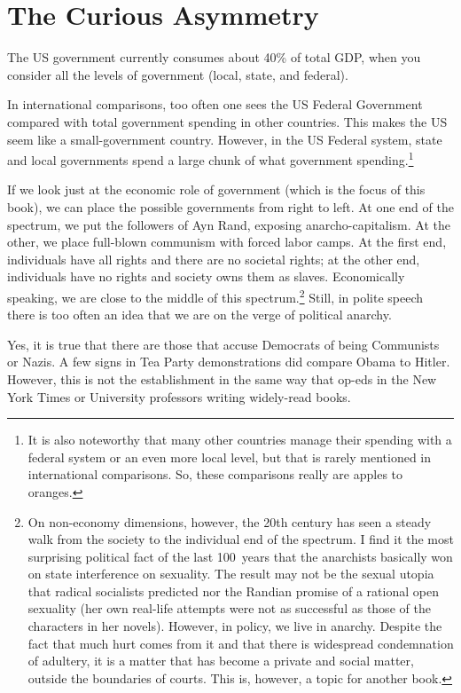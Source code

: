 \chapter{The Curious Asymmetry}

The US government currently consumes about 40\% of total GDP, when you consider
all the levels of government (local, state, and federal).

In international comparisons, too often one sees the US Federal Government
compared with total government spending in other countries. This makes the US
seem like a small-government country. However, in the US Federal system, state
and local governments spend a large chunk of what government
spending.\footnote{It is also noteworthy that many other countries manage their
spending with a federal system or an even more local level, but that is rarely
mentioned in international comparisons.  So, these comparisons really are
apples to oranges.}

If we look just at the economic role of government (which is the focus of this
book), we can place the possible governments from right to left. At one end of
the spectrum, we put the followers of Ayn Rand, exposing anarcho-capitalism. At
the other, we place  full-blown communism with forced labor camps. At the first
end, individuals have all rights and there are no societal rights; at the other
end, individuals have no rights and society owns them as slaves.  Economically
speaking, we are close to the middle of this spectrum.\footnote{On non-economy
dimensions, however, the 20th century has seen a steady walk from the society
to the individual end of the spectrum. I find it the most surprising political
fact of the last 100~years that the anarchists basically won on state
interference on sexuality. The result may not be the sexual utopia that radical
socialists predicted nor the Randian promise of a rational open sexuality (her
own real-life attempts were not as successful as those of the characters in her
novels). However, in policy, we live in anarchy. Despite the
fact that much hurt comes from it and that there is widespread condemnation of
adultery, it is a matter that has become a private and social matter, outside
the boundaries of courts.  This is, however, a topic for another book.} Still,
in polite speech there is too often an idea that we are on the verge of
political anarchy.

Yes, it is true that there are those that accuse Democrats of being Communists
or Nazis. A few signs in Tea Party demonstrations did compare Obama to Hitler.
However, this is not the establishment in the same way that op-eds in the New
York Times or University professors writing widely-read books.

